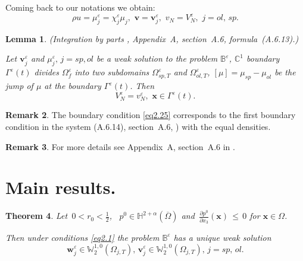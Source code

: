 \documentclass{article}
\theoremstyle{plain}
\newtheorem{theorem}{Theorem}[section]
\newtheorem{lemma}[theorem]{Lemma}
\theoremstyle{definition}
\newtheorem{remark}[theorem]{Remark}
\numberwithin{equation}{section}
\begin{document}
Coming back to our notations we obtain: 
\begin{equation}\label{eq2.24}
\rho{u}=\mu^{\varepsilon}_{j}=\chi^{\varepsilon}_{j}\mu_{j},\,\,
\boldsymbol{v}=\boldsymbol{v}^{\varepsilon}_{j},\,\,
v_{N}={V}^{\varepsilon}_{N},\,\,j=ol,\,sp.
\end{equation}
\begin{lemma}\label{l2.17}
(Integration by parts \cite{14}, Appendix~A, section~A.6, formula~(A.6.13).)

Let $\boldsymbol{v}^{\varepsilon}_{j}$ and ${\mu}^{\varepsilon}_{j},\,j=sp,ol$ be a weak solution to the problem $\mathbb{B}^{\varepsilon}$, $\mathbb{C}^{1}$ boundary $\Gamma^{\varepsilon}(t)$ divides $\Omega^{\varepsilon}_{f}$ into two subdomains $\Omega^{\varepsilon}_{sp,T}$ and $\Omega^{\varepsilon}_{ol,T}$, $[{\mu}]={\mu}_{sp}-{\mu}_{ol}$ be the jump of ${\mu}$ at the boundary $\Gamma^{\varepsilon}(t)$. Then  
\begin{equation}\label{eq2.25}
{V}^{\varepsilon}_{N}={v}^{\varepsilon}_{N},\,\,\boldsymbol{x}\in\Gamma^{\varepsilon}(t).
\end{equation}
\end{lemma}

\begin{remark}\label{4}
The boundary condition \eqref{eq2.25} corresponds to the first boundary condition in the system (A.6.14), section~A.6, \cite{14}) with the equal densities.
\end{remark}

\begin{remark}\label{2.18}
For more details see Appendix~A, section~A.6 in \cite{14}.
\end{remark}

\section{Main results.}
\label{sec3}

\begin{theorem}\label{t3.1}
Let $\displaystyle\,0<r_{0}<\frac{1}{2}$, \, ${p}^{0}\in\mathbb{H}^{2+\alpha}(\overline{\Omega})$ and
$\displaystyle\,\frac{\partial{p^{0}}}{\partial{x}_{3}}(\boldsymbol{x})\,\leqslant\,0$
for $\boldsymbol{x}\in\Omega$.

Then under conditions \eqref{eq2.1} the problem $\mathbb{B}^{\varepsilon}$ has a unique weak solution
\begin{equation}\label{eq3.1}
\boldsymbol{w}^{\varepsilon}_{j}\in\mathbb{W}^{1,0}_{2}(\Omega_{j,T}),\,\boldsymbol{v}^{\varepsilon}_{j}
\in\mathbb{W}^{1,0}_{2}(\Omega_{j,T}),\,j=sp,\,ol.
\end{equation}
\end{theorem}
\end{document}

